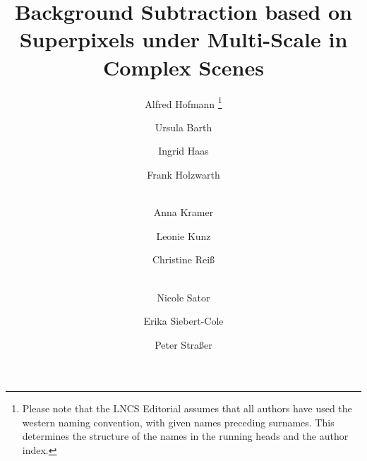 \documentclass[runningheads,a4paper]{llncs}
\begin{document}
\mainmatter  %

\title{Background Subtraction based on Superpixels under Multi-Scale in
Complex Scenes}


%
%
\author{Alfred Hofmann
\thanks{Please note that the LNCS Editorial assumes that all authors have used
the western naming convention, with given names preceding surnames. This determines
the structure of the names in the running heads and the author index.}%
\and Ursula Barth\and Ingrid Haas\and Frank Holzwarth\and\\
Anna Kramer\and Leonie Kunz\and Christine Rei\ss\and\\
Nicole Sator\and Erika Siebert-Cole\and Peter Stra\ss er}
%


%
%

\maketitle
\end{document}

